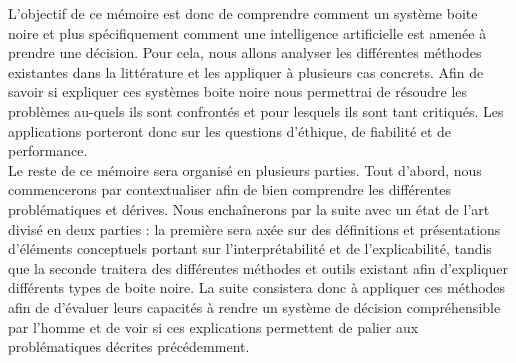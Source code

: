 L’objectif de ce mémoire est donc de comprendre comment un système boite noire et plus spécifiquement comment une intelligence artificielle est amenée à prendre une décision. Pour cela, nous allons analyser les différentes méthodes existantes dans la littérature et les appliquer à plusieurs cas concrets. Afin de savoir si expliquer ces systèmes boite noire nous permettrai de résoudre les problèmes au-quels ils sont confrontés et pour lesquels ils sont tant critiqués. Les applications porteront donc sur les questions d'éthique, de fiabilité et de performance.\\

Le reste de ce mémoire sera organisé en plusieurs parties. Tout d'abord, nous commencerons par contextualiser afin de bien comprendre les différentes problématiques et dérives. Nous enchaînerons par la suite avec un état de l'art divisé en deux parties : la première sera axée sur des définitions et présentations d'éléments conceptuels portant sur l'interprétabilité et de l'explicabilité, tandis que la seconde traitera des différentes méthodes et outils existant afin d'expliquer différents types de boite noire. La suite consistera donc à appliquer ces méthodes afin de d'évaluer leurs capacités à rendre un système de décision compréhensible par l'homme et de voir si ces explications permettent de palier aux problématiques décrites précédemment.

